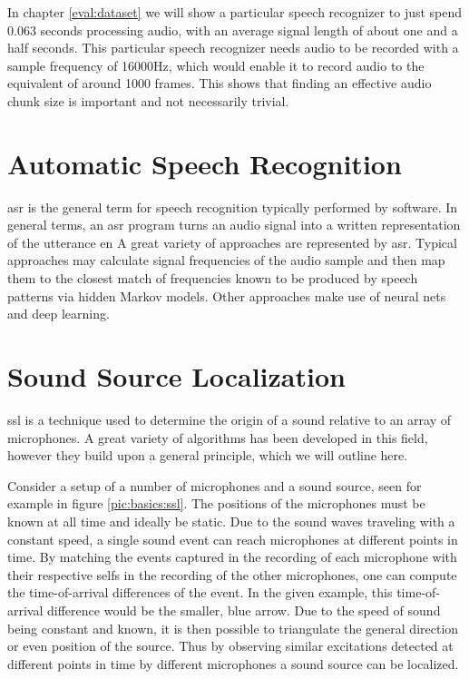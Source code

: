 In chapter \ref{eval:dataset} we will show a particular speech recognizer to just spend 0.063 seconds processing audio, with an average signal length of about one and a half seconds.
This particular speech recognizer needs audio to be recorded with a sample frequency of 16000Hz, which would enable it to record audio to the equivalent
of around 1000 frames. %
This shows that finding an effective audio chunk size is important and not necessarily trivial.

\section{Automatic Speech Recognition}
\gls{asr} is the general term for speech recognition typically performed by software.
In general terms, an \gls{asr} program turns an audio signal into a written representation of the utterance en
A great variety of approaches are represented by \gls{asr}.
Typical approaches may calculate signal frequencies of the audio sample and then map them to the closest match of frequencies known to be produced by speech patterns via hidden Markov models.
Other approaches make use of neural nets and deep learning.

\section{Sound Source Localization}
\label{basics:ssl}
\gls{ssl} is a technique used to determine the origin of a sound relative to an array of microphones.
A great variety of algorithms has been developed in this field, however they build upon a general principle, which we will outline here.

Consider a setup of a number of microphones and a sound source, seen for example in figure \ref{pic:basics:ssl}.
The positions of the microphones must be known at all time and ideally be static.
Due to the sound waves traveling with a constant speed, a single sound event can reach microphones at different points in time.
By matching the events captured in the recording of each microphone with their respective selfs in the recording of the other microphones, one can compute the time-of-arrival differences of the event.
In the given example, this time-of-arrival difference would be the smaller, blue arrow.
Due to the speed of sound being constant and known, it is then possible to triangulate the general direction or even position of the source.
Thus by observing similar excitations detected at different points in time by different microphones a sound source can be localized.

